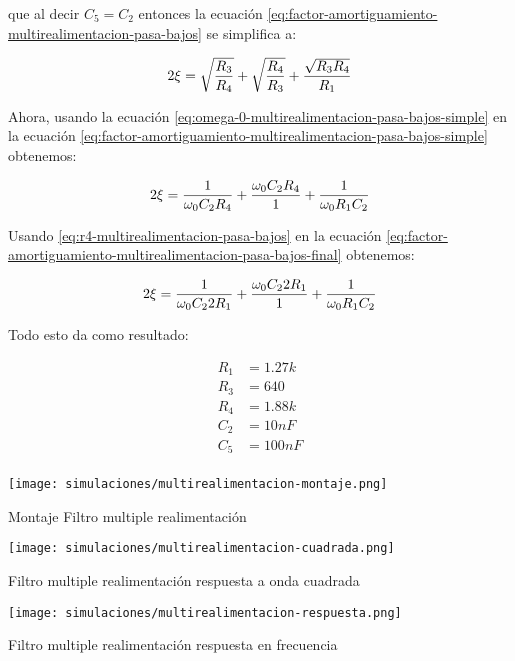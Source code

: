 que al decir $C_5 = C_2$ entonces la ecuación \ref{eq:factor-amortiguamiento-multirealimentacion-pasa-bajos} se simplifica a:

\begin{equation}
    2\xi = \sqrt{\frac{R_3}{R_4}} + \sqrt{\frac{R_4}{R_3}} + \frac{\sqrt{R_3 R_4}}{R_1} 
    \label{eq:factor-amortiguamiento-multirealimentacion-pasa-bajos-simple}
\end{equation}

Ahora, usando la ecuación \ref{eq:omega-0-multirealimentacion-pasa-bajos-simple} en la ecuación \ref{eq:factor-amortiguamiento-multirealimentacion-pasa-bajos-simple} obtenemos:

\begin{equation}
    2\xi = \frac{1}{\omega_0 C_2 R_4} + \frac{\omega_0 C_2 R_4}{1} + \frac{1}{\omega_0 R_1 C_2} 
    \label{eq:factor-amortiguamiento-multirealimentacion-pasa-bajos-final}
\end{equation}

Usando \ref{eq:r4-multirealimentacion-pasa-bajos} en la ecuación \ref{eq:factor-amortiguamiento-multirealimentacion-pasa-bajos-final} obtenemos:

\begin{equation}
    2\xi = \frac{1}{\omega_0 C_2 2R_1} + \frac{\omega_0 C_2 2R_1}{1} + \frac{1}{\omega_0 R_1 C_2} 
    \label{eq:factor-amortiguamiento-multirealimentacion-pasa-bajos-final-final}
\end{equation}

Todo esto da como resultado:

\begin{align*}
    R_1 &= 1.27k \\
    R_3 &= 640 \\
    R_4 &= 1.88k \\
    C_2 &= 10nF \\
    C_5 &= 100nF \\
\end{align*}

\begin{ilustracion}[ht]
    \centering
    \texttt{[image: simulaciones/multirealimentacion-montaje.png]}
    \caption{Montaje Filtro multiple realimentación}\label{ilus:sim-multirealimentacion-montaje} 
\end{ilustracion}
\begin{ilustracion}[ht]
    \centering
    \texttt{[image: simulaciones/multirealimentacion-cuadrada.png]}
    \caption{Filtro multiple realimentación respuesta a onda cuadrada}
    \label{ilus:sim-multirealimentacion-cuadrada} 
\end{ilustracion}
\begin{ilustracion}[ht]
    \centering
    \texttt{[image: simulaciones/multirealimentacion-respuesta.png]}
    \caption{Filtro multiple realimentación respuesta en frecuencia  }
    \label{ilus:sim-multirealimentacion-respuesta} 
\end{ilustracion}